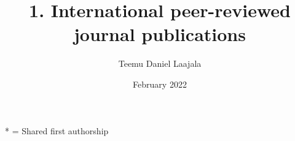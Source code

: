 \documentclass{article}
\title{1. International peer-reviewed journal publications}
\author{Teemu Daniel Laajala}
\date{February 2022}
\begin{document}
\maketitle

\nocite{*}

* = Shared first authorship

\vspace*{-1cm}



\end{document}
